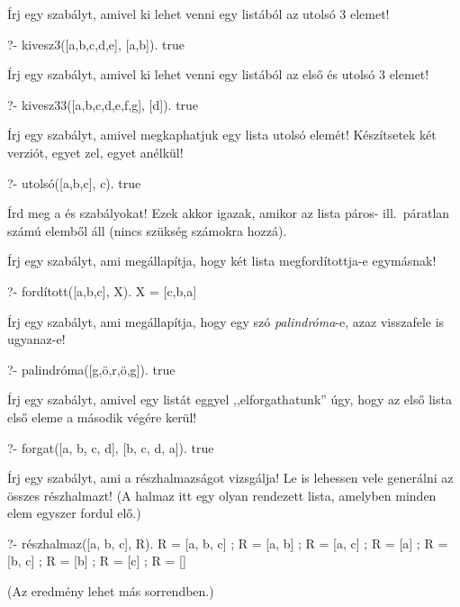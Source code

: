 \begin{problem}
Írj egy szabályt, amivel ki lehet venni egy
listából az utolsó 3 elemet!
\begin{query}
?- kivesz3([a,b,c,d,e], [a,b]).
true
\end{query}
\end{problem}
\begin{problem}
Írj egy szabályt, amivel ki lehet venni egy
listából az első és utolsó 3 elemet!
\begin{query}
?- kivesz33([a,b,c,d,e,f,g], [d]).
true
\end{query}
\end{problem}
\begin{problem}
Írj egy szabályt, amivel megkaphatjuk egy lista
utolsó elemét! Készítsetek két verziót, egyet
zel, egyet anélkül!
\begin{query}
?- utolsó([a,b,c], c).
true
\end{query}
\end{problem}
\begin{problem}
Írd meg a  és
 szabályokat! Ezek akkor
igazak, amikor az  lista páros- ill.~páratlan
számú elemből áll (nincs szükség számokra hozzá).
\end{problem}
\begin{problem}
Írj egy szabályt, ami megállapítja, hogy két
lista megfordítottja-e egymásnak!
\begin{query}
?- fordított([a,b,c], X).
X = [c,b,a]
\end{query}
\end{problem}
\begin{problem}
Írj egy szabályt, ami megállapítja, hogy egy szó
\emph{palindróma}-e, azaz visszafele is ugyanaz-e!
\begin{query}
?- palindróma([g,ö,r,ö,g]).
true
\end{query}
\end{problem}
\begin{problem}
Írj egy szabályt, amivel egy listát eggyel
,,elforgathatunk'' úgy, hogy az első lista első eleme
a második végére kerül!
\begin{query}
?- forgat([a, b, c, d], [b, c, d, a]).
true
\end{query}
\end{problem}
\begin{problem}
Írj egy szabályt, ami a részhalmazságot
vizsgálja! Le is lehessen vele generálni az összes
részhalmazt! (A halmaz itt egy olyan rendezett
lista, amelyben minden elem egyszer fordul elő.)
\begin{query}
?- részhalmaz([a, b, c], R).
R = [a, b, c] ;
R = [a, b] ;
R = [a, c] ;
R = [a] ;
R = [b, c] ;
R = [b] ;
R = [c] ;
R = []
\end{query}
(Az eredmény lehet más sorrendben.)
\end{problem}
